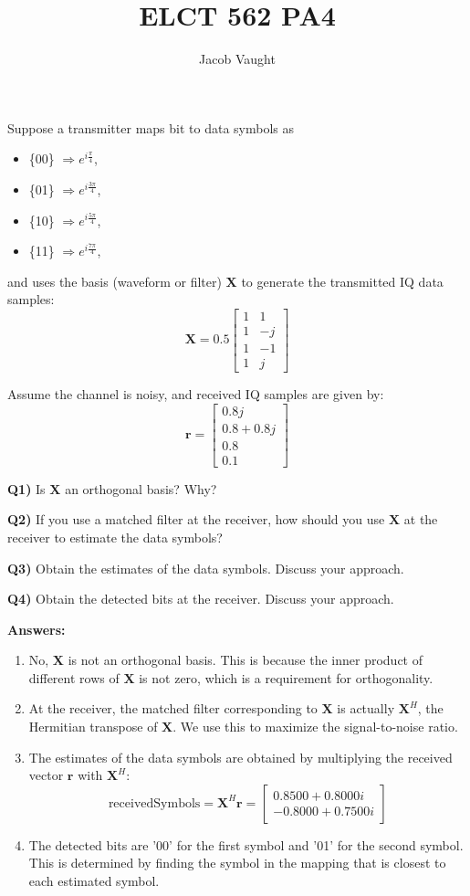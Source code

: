 \documentclass[12pt]{article}
\title{ELCT 562 PA4}
\author{Jacob Vaught}
\date{}
\begin{document}
\maketitle

Suppose a transmitter maps bit to data symbols as 
\begin{itemize}
    \item \{00\} $\Rightarrow e^{i\frac{\pi}{4}}$,
    \item \{01\} $\Rightarrow e^{i\frac{3\pi}{4}}$,
    \item \{10\} $\Rightarrow e^{i\frac{5\pi}{4}}$,
    \item \{11\} $\Rightarrow e^{i\frac{7\pi}{4}}$,
\end{itemize}
and uses the basis (waveform or filter) $\mathbf{X}$ to generate the transmitted IQ data samples: 
\[ \mathbf{X} = 0.5 \begin{bmatrix} 1 & 1 \\ 1 & -j \\ 1 & -1 \\ 1 & j \end{bmatrix} \]

Assume the channel is noisy, and received IQ samples are given by: 
\[ \mathbf{r} = \begin{bmatrix} 0.8j \\ 0.8 + 0.8j \\ 0.8 \\ 0.1 \end{bmatrix} \]

\textbf{Q1)} Is $\mathbf{X}$ an orthogonal basis? Why?

\textbf{Q2)} If you use a matched filter at the receiver, how should you use $\mathbf{X}$ at the receiver to estimate the data symbols?

\textbf{Q3)} Obtain the estimates of the data symbols. Discuss your approach.

\textbf{Q4)} Obtain the detected bits at the receiver. Discuss your approach.

\textbf{Answers:} 
\begin{enumerate}
  \item No, \(\mathbf{X}\) is not an orthogonal basis. This is because the inner product of different rows of \(\mathbf{X}\) is not zero, which is a requirement for orthogonality.
  \item At the receiver, the matched filter corresponding to \(\mathbf{X}\) is actually \(\mathbf{X}^H\), the Hermitian transpose of \(\mathbf{X}\). We use this to maximize the signal-to-noise ratio.
  \item The estimates of the data symbols are obtained by multiplying the received vector \(\mathbf{r}\) with \(\mathbf{X}^H\):
  \[\text{receivedSymbols} = \mathbf{X}^H \mathbf{r} = \begin{bmatrix} 0.8500 + 0.8000i \\ -0.8000 + 0.7500i \end{bmatrix}\]
  \item The detected bits are '00' for the first symbol and '01' for the second symbol. This is determined by finding the symbol in the mapping that is closest to each estimated symbol.
\end{enumerate}
\end{document}
